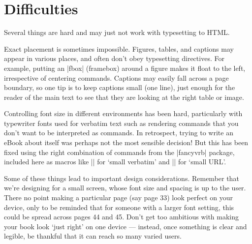 \section{Difficulties}

Several things are hard and may just not work with typesetting to HTML.

Exact placement is sometimes impossible. Figures, tables, and captions may appear
in various places, and often don't obey typesetting directives. For example,
putting an \sverb|fbox| (framebox) around a figure makes it float to the left, irrespective of
centering commands. Captions may easily fall across
a page boundary, so one tip is to keep captions small (one line), just enough for the reader
of the main text to see that they are looking at the right table or image.

Controlling font size in different environments has been hard, particularly with typewriter fonts
used for verbatim text such as rendering \latex commands that you don't want to be interpreted as
\latex commands. In retrospect, trying to write an eBook about \latex itself was perhaps not the
most sensible decision! But this has been fixed using the right combination of commands from the
\sverb|fancyvrb| package, included here as macros like \sverb|\sverb| for `small verbatim' and
\sverb|\surl| for `small URL'.

Some of these things lead to important design considerations.
Remember that we're designing for a small screen, whose font size and spacing is up to the user. 
There no point making a particular page (say page 33) look perfect on your device,
only to be reminded that for someone with a larger font setting, this could be spread across
pages 44 and 45. Don't get too ambitious with making your book
look `just right' on one device --- instead, once something is clear and legible, be thankful
that it can reach so many varied users.

